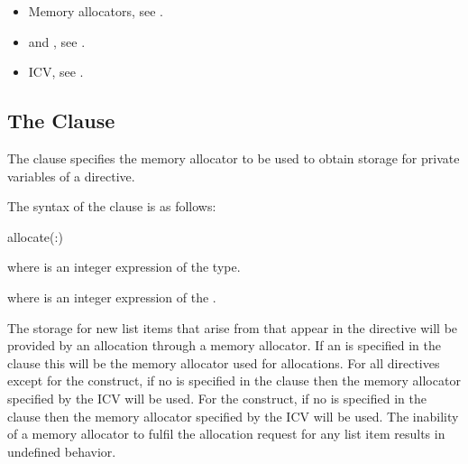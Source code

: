 \crossreferences
\begin{itemize}
\item Memory allocators, see .
\item {} and , see .
\item {} ICV, see .
\end{itemize}

\subsection{The  Clause}
\label{subsec:allocate Clause}
\summary
The  clause specifies the memory allocator to be used to obtain storage for private variables of a directive.

\syntax

The syntax of the  clause is as follows:

\begin{boxedcode}
allocate(\plc{[allocator}:\plc{] list})
\end{boxedcode}

\begin{ccppspecific}
where  is an integer expression of the  type.
\end{ccppspecific}
\begin{fortranspecific}
where  is an integer expression of the  .
\end{fortranspecific}

\descr

The storage for new list items that arise from  that appear in the directive will be provided by an allocation through a memory allocator. If an  is specified in the clause this will be the memory allocator used for allocations. For all directives except for the  construct, if no  is specified in the clause then the memory allocator specified by the  ICV will be used. For the  construct, if no  is specified in the clause then the memory allocator specified by the  ICV will be used.  The inability of a memory allocator to fulfil the allocation request for any list item results in undefined behavior.

